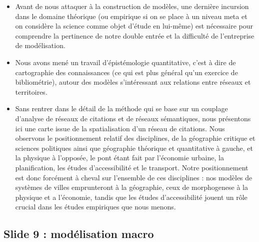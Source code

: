 \documentclass[11pt]{article}
\begin{document}
\begin{itemize}
	\item Avant de nous attaquer à la construction de modèles, une dernière incursion dans le domaine théorique (ou empirique si on se place à un niveau meta et on considère la science comme objet d'étude en lui-même) est nécessaire pour comprendre la pertinence de notre double entrée et la difficulté de l'entreprise de modélisation.
	\item Nous avons mené un travail d'épistémologie quantitative, c'est à dire de cartographie des connaissances (ce qui est plus général qu'un exercice de bibliométrie), autour des modèles s'intéressant aux relations entre réseaux et territoires.
	\item Sans rentrer dans le détail de la méthode qui se base sur un couplage d'analyse de réseaux de citations et de réseaux sémantiques, nous présentons ici une carte issue de la spatialisation d'un réseau de citations. Nous observons le positionnement relatif des disciplines, de la géographie critique et sciences politiques ainsi que géographie théorique et quantitative à gauche, et la physique à l'opposée, le pont étant fait par l'économie urbaine, la planification, les études d'accessibilité et le transport. Notre positionnement est donc forcément à cheval sur l'ensemble de ces disciplines : nos modèles de systèmes de villes emprunteront à la géographie, ceux de morphogenese à la physique et a l'économie, tandis que les études d'accessibilité jouent un rôle crucial dans les études empiriques que nous menons.
\end{itemize}




\subsection*{Slide 9 : modélisation macro}

\end{document}
